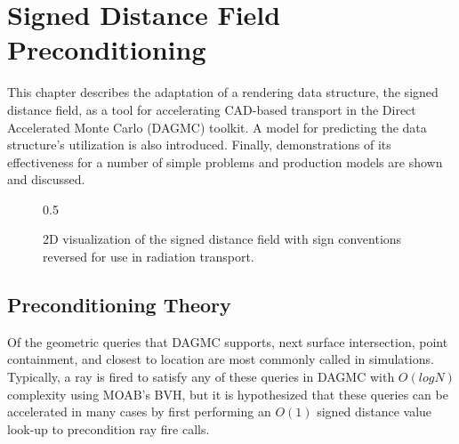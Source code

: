 

\newcommand{\precondQuery}[4] {
  \null %
  \textbf{\uppercase{#1}} 
  \begin{adjustwidth}{1em}{0pt}
    \begin{figure}[H]
      \begin{center}
        {0.65\textwidth}
        \caption{#3}
        \label{fig:#2}
      \end{center}
    \end{figure}
    #4
  \end{adjustwidth}
}

\chapter{Signed Distance Field Preconditioning}\label{ch:preconditioning}

This chapter describes the adaptation of a rendering data structure, the signed
distance field, as a tool for accelerating CAD-based transport in the Direct
Accelerated Monte Carlo (DAGMC) toolkit. A model for predicting the data
structure's utilization is also introduced. Finally, demonstrations of its
effectiveness for a number of simple problems and production models are shown
and discussed.

\begin{figure}[H]
  {0.5\textwidth}
  \centering
  \caption{2D visualization of the signed distance field with sign conventions
    reversed for use in radiation transport.}
  \label{fig:preconditioner_datastruct}
\end{figure}

\section{Preconditioning Theory}\label{section:preconditioner_theory}

Of the geometric queries that DAGMC supports, next surface intersection, point
containment, and closest to location are most commonly called in simulations.
Typically, a ray is fired to satisfy any of these queries in DAGMC with
$O(logN)$ complexity using MOAB's BVH, but it is hypothesized that these queries
can be accelerated in many cases by first performing an $O(1)$ signed distance
value look-up to precondition ray fire calls.


